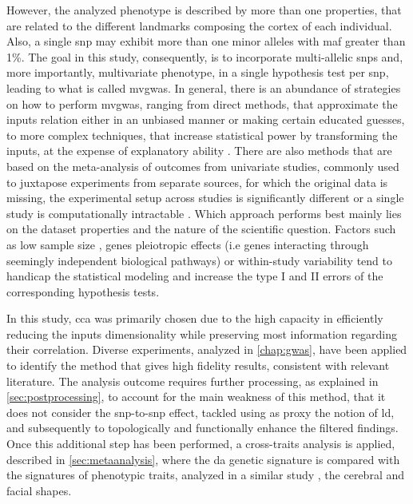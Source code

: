 However, the analyzed phenotype is described by more than one properties, that are related to the different landmarks composing the cortex of each individual. Also, a single \ac{snp} may exhibit more than one minor alleles with \ac{maf} greater than 1\%. The goal in this study, consequently, is to incorporate multi-allelic \acsp{snp} and, more importantly, multivariate phenotype, in a single hypothesis test per \ac{snp}, leading to what is called \ac{mvgwas}. In general, there is an abundance of strategies on how to perform \ac{mvgwas}, ranging from direct methods, that approximate the inputs relation either in an unbiased manner or making certain educated guesses, to more complex techniques, that increase statistical power by transforming the inputs, at the expense of explanatory ability \cite{Galesloot2014}. There are also methods that are based on the meta-analysis of outcomes from univariate studies, commonly used to juxtapose experiments from separate sources, for which the original data is missing, the experimental setup across studies is significantly different or a single study is computationally intractable \cite{Uffelmann2021,Cichonska2016}. Which approach performs best mainly lies on the dataset properties and the nature of the scientific question. Factors such as low sample size \cite{Sheng2021}, genes pleiotropic effects \cite{Fernandes2021} (i.e genes interacting through seemingly independent biological pathways) or within-study variability \cite{Usui2021,Jackson2011} tend to handicap the statistical modeling and increase the type I and II errors of the corresponding hypothesis tests. 





In this study, \ac{cca} was primarily chosen due to the high capacity in efficiently reducing the inputs dimensionality while preserving most information regarding their correlation. Diverse experiments, analyzed in \autoref{chap:gwas}, have been applied to identify the method that gives high fidelity results, consistent with relevant literature. The analysis outcome requires further processing, as explained in \autoref{sec:postprocessing}, to account for the main weakness of this method, that it does not consider the \ac{snp}-to-\ac{snp} effect, tackled using as proxy the notion of \ac{ld}, and subsequently to topologically and functionally enhance the filtered findings. Once this additional step has been performed, a cross-traits analysis is applied, described in \autoref{sec:metaanalysis}, where the \ac{da} genetic signature is compared with the signatures of phenotypic traits, analyzed in a similar study \cite{Naqvi2021}, the cerebral and facial shapes.





